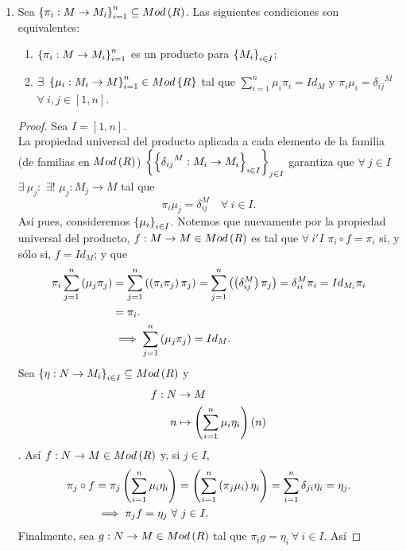 \documentclass{article}
\begin{document}
\begin{enumerate}[label=\textbf{Ej \arabic*.}]
\begin{proof}
\end{proof}
	\item Sea $\left\{\pi_i:M\to M_i\right\}_{i=1}^n\subseteq Mod\left(R\right)$. Las siguientes condiciones son equivalentes:
	\begin{enumerate}[label=\alph*)]
		\item $\left\{\pi_i:M\to M_i\right\}_{i=1}^n$ es un producto para ${\left\{{M}_{i}\right\}}_{i\in I}$;
		\item $\exists\ \left\{\mu_i:M_i\to M\right\}_{i=1}^n\in Mod\left\{R\right\}$ tal que $\sum_{i=1}^n\mu_i\pi_i=Id_M$ y $\pi_i\mu_i={\delta_{ij}}^M$ $\forall\ i,j\in[1,n]$.
	\end{enumerate}
	\begin{proof}
		Sea $I=[1,n]$.\\
		\boxed{\implies} La propiedad universal del producto aplicada a cada elemento de la familia (de familias en $Mod\left(R\right)$) $\left\{\left\{{\delta_{ij}}^M:M_i\to M_i\right\}_{i\in I}\right\}_{j\in I}$ garantiza que $\forall\ j\in I$ $\exists\ \mu_j:$ $\exists !$ $\mu_j:M_j\to M$ tal que \begin{equation*}
			\pi_i\mu_j=\delta_{ij}^M\quad \forall\ i\in I.
		\end{equation*}
	Así pues, consideremos ${\left\{{\mu}_{i}\right\}}_{i\in I}$. Notemos que nuevamente por la propiedad universal del producto, $f:M\to M\in Mod\left(R\right)$ es tal que $\forall\ i' I$ $\pi_i\circ f=\pi_i$ si, y sólo si, $f=Id_M$; y que
	\begin{align*}
		\pi_i\sum_{j=1}^n\left(\mu_j\pi_j\right)&=\sum_{j=1}^n\left(\left(\pi_i\pi_j\right)\pi_j\right)=\sum_{j=1}^n\left(\left(\delta_{ij}^M\right)\pi_j\right)=\delta_{ii}^M\pi_i=Id_{M_i}\pi_i\\
		&=\pi_i.\\
		&\implies \sum_{j=1}^n\left(\mu_j\pi_j\right)=Id_M.
	\end{align*} 
	\boxed{\impliedby} Sea $\left\{\eta:N\to M_i\right\}_{i\in I}\subseteq Mod\left(R\right)$ y 
	\begin{align*}
		f: N &\rightarrow M\\ n &\mapsto \left(\sum_{i=1}^n\mu_i\eta_i\right)\left(n\right)
	\end{align*}. Así $f:N\to M\in Mod\left(R\right)$ y, si $j\in I$,
\begin{align*}
	\pi_j\circ f&=\pi_j\left(\sum_{i=1}^n\mu_i\eta_i\right)=\left(\sum_{i=1}^n\left(\pi_j\mu_i\right)\eta_i\right)=\sum_{i=1}^n\delta_{ji}\eta_i=\eta_j.\\
	&\implies\pi_j f=\eta_j\ \forall\ j\in I.
\end{align*}
Finalmente, sea $g:N\to M\in Mod\left(R\right)$ tal que $\pi_i g=\eta_i\ \forall\ i\in I$. Así

\end{proof}
\end{enumerate}
\end{document}
